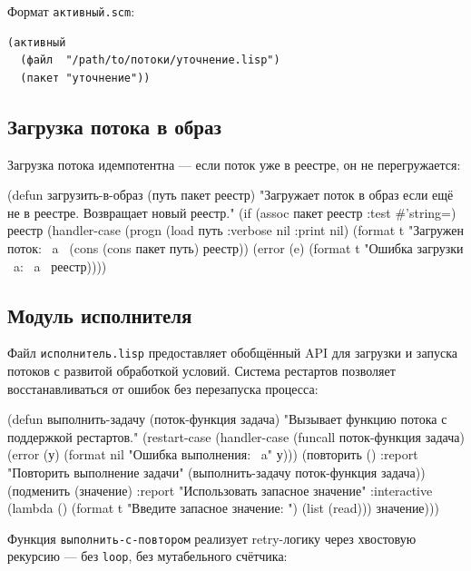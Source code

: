 \documentclass[11pt,a4paper]{article}
\begin{document}
Формат \texttt{активный.scm}:
\begin{verbatim}
(активный
  (файл  "/path/to/потоки/уточнение.lisp")
  (пакет "уточнение"))
\end{verbatim}

\subsection{Загрузка потока в образ}

Загрузка потока идемпотентна — если поток уже в реестре, он не перегружается:

\begin{lispcode}[caption={подмастерье/main.lisp — ленивая загрузка в образ}]
(defun загрузить-в-образ (путь пакет реестр)
  "Загружает поток в образ если ещё не в реестре.
  Возвращает новый реестр."
  (if (assoc пакет реестр :test #'string=)
      реестр
      (handler-case
          (progn
            (load путь :verbose nil :print nil)
            (format t "Загружен поток: ~a~%
            (cons (cons пакет путь) реестр))
        (error (e)
          (format t "Ошибка загрузки ~a: ~a~%
          реестр))))
\end{lispcode}

\subsection{Модуль исполнителя}

Файл \texttt{исполнитель.lisp} предоставляет обобщённый API для загрузки и запуска потоков с развитой обработкой условий. Система рестартов позволяет восстанавливаться от ошибок без перезапуска процесса:

\begin{lispcode}[caption={подмастерье/исполнитель.lisp — выполнение с рестартами}]
(defun выполнить-задачу (поток-функция задача)
  "Вызывает функцию потока с поддержкой рестартов."
  (restart-case
      (handler-case
          (funcall поток-функция задача)
        (error (у)
          (format nil "Ошибка выполнения: ~a" у)))
    (повторить ()
      :report "Повторить выполнение задачи"
      (выполнить-задачу поток-функция задача))
    (подменить (значение)
      :report "Использовать запасное значение"
      :interactive (lambda ()
                     (format t "Введите запасное значение: ")
                     (list (read)))
      значение)))
\end{lispcode}

Функция \texttt{выполнить-с-повтором} реализует retry-логику через хвостовую рекурсию — без \texttt{loop}, без мутабельного счётчика:
\end{document}
